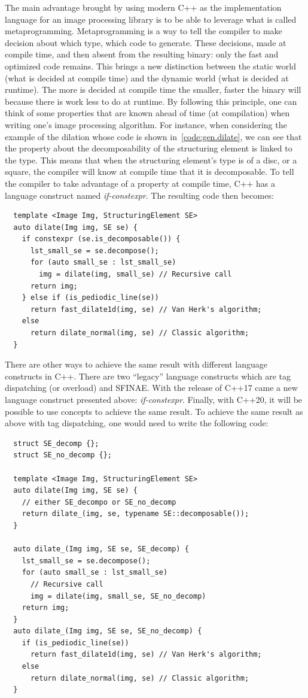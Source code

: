 The main advantage brought by using modern C++ as the implementation language for an image processing library is to be
able to leverage what is called metaprogramming. Metaprogramming is a way to tell the compiler to make decision about
which type, which code to generate. These decisions, made at compile time, and then absent from the resulting binary:
only the fast and optimized code remains. This brings a new distinction between the static world (what is decided at
compile time) and the dynamic world (what is decided at runtime). The more is decided at compile time the smaller,
faster the binary will because there is work less to do at runtime. By following this principle, one can think of some
properties that are known ahead of time (at compilation) when writing one's image processing algorithm. For instance,
when considering the example of the dilation whose code is shown in~\ref{code:gen.dilate}, we can see that the property
about the decomposability of the structuring element is linked to the type. This means that when the structuring
element's type is of a disc, or a square, the compiler will know at compile time that it is decomposable. To tell the
compiler to take advantage of a property at compile time, C++ has a language construct named \emph{if-constexpr}. The
resulting code then becomes:

\begin{verbatim}
  template <Image Img, StructuringElement SE>
  auto dilate(Img img, SE se) {
    if constexpr (se.is_decomposable()) {
      lst_small_se = se.decompose();
      for (auto small_se : lst_small_se)
        img = dilate(img, small_se) // Recursive call
      return img;
    } else if (is_pediodic_line(se))
      return fast_dilate1d(img, se) // Van Herk's algorithm;
    else
      return dilate_normal(img, se) // Classic algorithm;
  }
\end{verbatim}

There are other ways to achieve the same result with different language constructs in C++. There are two ``legacy''
language constructs which are tag dispatching (or overload) and SFINAE. With the release of C++17 came a new language
construct presented above: \emph{if-constexpr}. Finally, with C++20, it will be possible to use concepts to achieve the
same result. To achieve the same result as above with tag dispatching, one would need to write the following code:

\begin{verbatim}
  struct SE_decomp {};
  struct SE_no_decomp {};

  template <Image Img, StructuringElement SE>
  auto dilate(Img img, SE se) {
    // either SE_decompo or SE_no_decomp
    return dilate_(img, se, typename SE::decomposable());
  }

  auto dilate_(Img img, SE se, SE_decomp) {
    lst_small_se = se.decompose();
    for (auto small_se : lst_small_se)
      // Recursive call
      img = dilate(img, small_se, SE_no_decomp)
    return img;
  }
  auto dilate_(Img img, SE se, SE_no_decomp) {
    if (is_pediodic_line(se))
      return fast_dilate1d(img, se) // Van Herk's algorithm;
    else
      return dilate_normal(img, se) // Classic algorithm;
  }
\end{verbatim}

